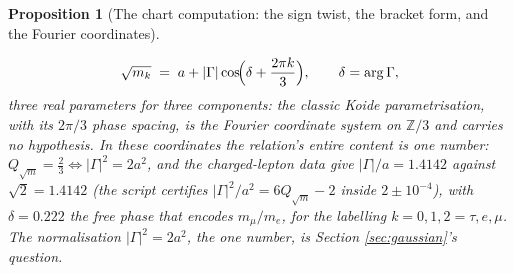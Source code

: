 \documentclass[11pt]{article}
\newtheorem{proposition}[theorem]{Proposition}
\theoremstyle{definition}
\begin{document}
\begin{proposition}[The chart computation: the sign twist, the bracket form, and the Fourier coordinates]
\begin{enumerate}
\begin{equation}\label{eq:parametrisation}
\sqrt{m_{k}} \;=\; a + |\Gamma|\cos\!\Bigl(\delta + \frac{2\pi k}{3}\Bigr), \qquad \delta = \arg\Gamma,
\end{equation}
three real parameters for three components: the classic Koide parametrisation, with its $2\pi/3$ phase spacing, is the Fourier coordinate system on $\mathbb{Z}/3$ and carries no hypothesis. In these coordinates the relation's entire content is one number: $Q_{\sqrt{m}} = \tfrac23 \iff |\Gamma|^{2} = 2a^{2}$, and the charged-lepton data give $|\Gamma|/a = 1.4142$ against $\sqrt{2} = 1.4142$ (the script certifies $|\Gamma|^{2}/a^{2} = 6Q_{\sqrt{m}} - 2$ inside $2 \pm 10^{-4}$), with $\delta = 0.222$ the free phase that encodes $m_{\mu}/m_{e}$, for the labelling $k = 0, 1, 2 = \tau, e, \mu$. The normalisation $|\Gamma|^{2} = 2a^{2}$, the one number, is Section \ref{sec:gaussian}'s question.
\end{enumerate}
\end{proposition}
\end{document}
